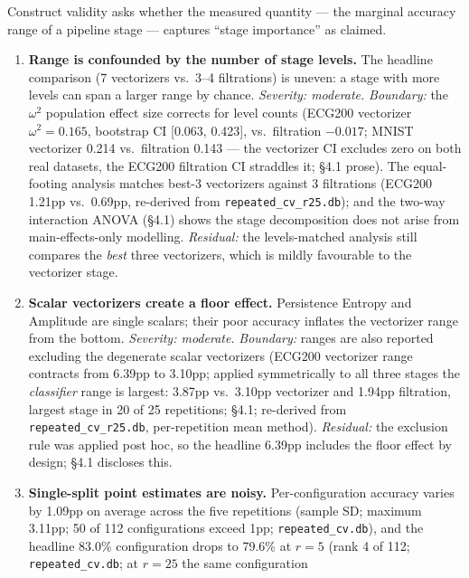 \documentclass[12pt, a4paper]{report}
\theoremstyle{definition}
\theoremstyle{plain}
\theoremstyle{remark}
\begin{document}
Construct validity asks whether the measured quantity --- the marginal
accuracy range of a pipeline stage --- captures ``stage
importance'' as claimed.

\begin{enumerate}
  \item \textbf{Range is confounded by the number of stage levels.} The
    headline comparison (7 vectorizers vs.\ 3--4 filtrations) is uneven:
    a stage with more levels can span a larger range by chance.
    \emph{Severity: moderate.} \emph{Boundary:} the $\omega^2$
    population effect size corrects for level counts (ECG200 vectorizer
    $\omega^2{=}0.165$, bootstrap CI [0.063, 0.423], vs.\ filtration
    $-0.017$; MNIST vectorizer 0.214 vs.\ filtration 0.143 --- the
    vectorizer CI excludes zero on both real datasets, the ECG200
    filtration CI straddles it; \S4.1 prose). The equal-footing
    analysis matches best-3 vectorizers against 3 filtrations (ECG200
    1.21pp vs.\ 0.69pp, re-derived from
    \texttt{repeated\_cv\_r25.db}); and the two-way interaction ANOVA
    (\S4.1) shows the stage decomposition does not arise from
    main-effects-only modelling. \emph{Residual:} the levels-matched
    analysis still compares the \emph{best} three vectorizers, which is
    mildly favourable to the vectorizer stage.
  \item \textbf{Scalar vectorizers create a floor effect.} Persistence
    Entropy and Amplitude are single scalars; their poor accuracy inflates
    the vectorizer range from the bottom. \emph{Severity: moderate.}
    \emph{Boundary:} ranges are also reported excluding the
    degenerate scalar vectorizers (ECG200 vectorizer range contracts from
    6.39pp to 3.10pp; applied symmetrically to all three stages the
    \emph{classifier} range is largest: 3.87pp vs.\ 3.10pp vectorizer
    and 1.94pp filtration, largest stage in 20 of 25 repetitions;
    \S4.1; re-derived from
    \texttt{repeated\_cv\_}\allowbreak\texttt{r25.db}, per-repetition
    mean method).
    \emph{Residual:} the exclusion rule was applied post hoc, so the
    headline 6.39pp includes the floor effect by design; \S4.1 discloses
    this.
  \item \textbf{Single-split point estimates are noisy.}
    Per-configuration accuracy varies by 1.09pp on average across the
    five repetitions (sample SD; maximum 3.11pp; 50 of 112
    configurations exceed 1pp; \texttt{repeated\_cv.db}), and the
    headline 83.0\% configuration drops to 79.6\% at $r{=}5$ (rank 4 of
    112; \texttt{repeated\_cv.db}; at $r{=}25$ the same configuration

\end{enumerate}
\end{document}
